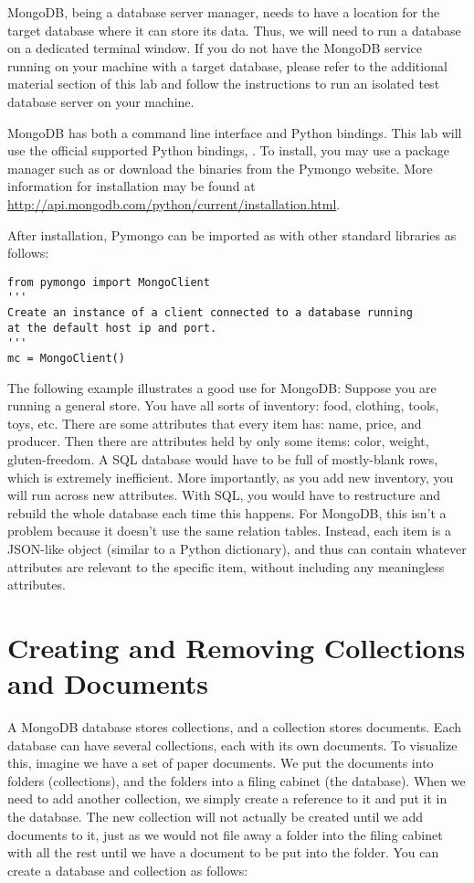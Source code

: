 MongoDB, being a database server manager, needs to have a location for the target database where it can store its data.
Thus, we will need to run a database on a dedicated terminal window.
If you do not have the MongoDB service running on your machine with a target database, please refer to the additional material section of this lab and follow the instructions to run an isolated test database server on your machine.

MongoDB has both a command line interface and Python bindings.
This lab will use the official supported Python bindings, .
To install, you may use a package manager such as  or download the binaries from the Pymongo website.
More information for installation may be found at \url{http://api.mongodb.com/python/current/installation.html}.

After installation, Pymongo can be imported as with other standard libraries as follows:

\begin{lstlisting}
from pymongo import MongoClient
'''
Create an instance of a client connected to a database running
at the default host ip and port.
'''
mc = MongoClient()
\end{lstlisting}

The following example illustrates a good use for MongoDB: Suppose you are running a general store.
You have all sorts of inventory: food, clothing, tools, toys, etc.
There are some attributes that every item has: name, price, and producer.
Then there are attributes held by only some items: color, weight, gluten-freedom.
A SQL database would have to be full of mostly-blank rows, which is extremely inefficient.
More importantly, as you add new inventory, you will run across new attributes.
With SQL, you would have to restructure and rebuild the whole database each time this happens.
For MongoDB, this isn't a problem because it doesn't use the same relation tables.
Instead, each item is a JSON-like object (similar to a Python dictionary), and thus can contain whatever attributes are relevant to the specific item, without including any meaningless attributes.


\section*{Creating and Removing Collections and Documents}
A MongoDB database stores collections, and a collection stores documents.
Each database can have several collections, each with its own documents.
To visualize this, imagine we have a set of paper documents.
We put the documents into folders (collections), and the folders into a filing cabinet (the database).
When we need to add another collection, we simply create a reference to it and put it in the database.
The new collection will not actually be created until we add documents to it, just as we would not file away a folder into the filing cabinet with all the rest until we have a document to be put into the folder.
You can create a database and collection as follows:


